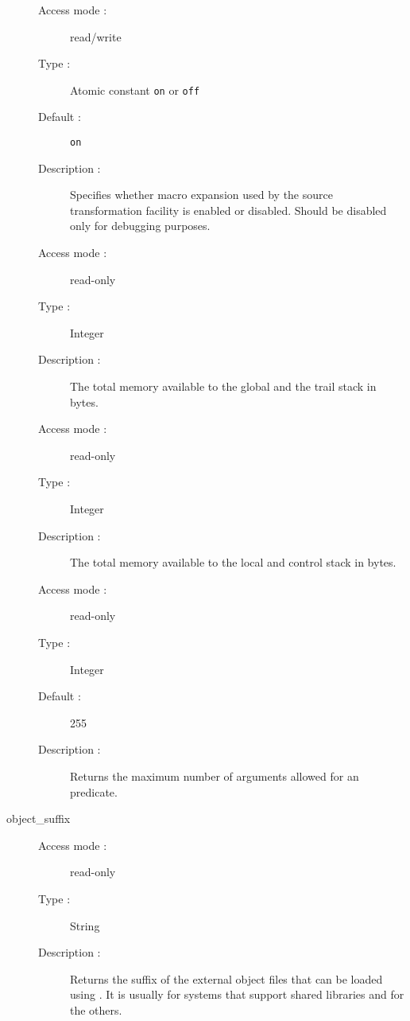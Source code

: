 \begin{description}
\begin{description}
\item[Access mode : ] read/write
\item[Type : ] Atomic constant {\tt on} or {\tt off}
\item[Default : ] {\tt on}
\item[Description : ] Specifies whether macro expansion used by the source
transformation facility is enabled or disabled.
Should be disabled only for debugging purposes.
\end{description}

\begin{description}
\item[Access mode :] read-only
\item[Type :] Integer
\item[Description :] The total memory available to the global and the trail
stack in bytes.
\end{description}

\begin{description}
\item[Access mode :] read-only
\item[Type :] Integer
\item[Description :] The total memory available to the local and control stack
in bytes.
\end{description}

\begin{description}
\item[Access mode : ] read-only
\item[Type : ] Integer
\item[Default : ] 255
\item[Description : ] Returns the maximum number of arguments allowed for
an {\eclipse} predicate.
\end{description}

\item[object_suffix]
\begin{description}
\item[Access mode : ] read-only
\item[Type : ] String
\item[Description : ] Returns the suffix of the external
object files that can be loaded using .
It is usually  for systems that support shared libraries
and  for the others.
\end{description}


\end{description}
